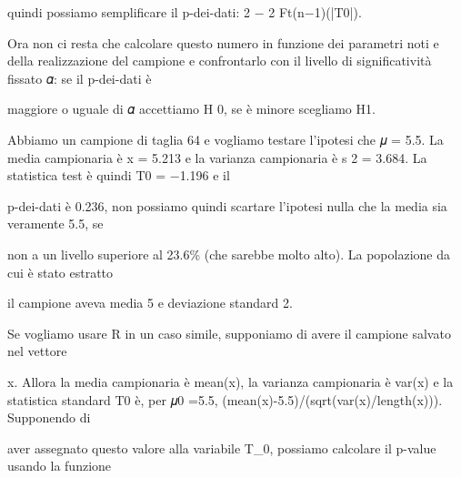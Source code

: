 \documentclass[a4paper,portrait,12pt]{article}
\begin{document}
\begin{flushleft}
quindi possiamo semplificare il p-dei-dati: 2 $-$ 2 Ft(n$-$1)(|T0|).
\end{flushleft}


\begin{flushleft}
Ora non ci resta che calcolare questo numero in funzione dei parametri noti e della realizzazione del campione e confrontarlo con il livello di significativit\`{a} fissato 𝛼: se il p-dei-dati \`{e}
\end{flushleft}


\begin{flushleft}
maggiore o uguale di 𝛼 accettiamo H 0, se \`{e} minore scegliamo H1.
\end{flushleft}


\begin{flushleft}
Abbiamo un campione di taglia 64 e vogliamo testare l'ipotesi che 𝜇 = 5.5. La media campionaria \`{e} x = 5.213 e la varianza campionaria \`{e} s 2 = 3.684. La statistica test \`{e} quindi T0 = $-$1.196 e il
\end{flushleft}


\begin{flushleft}
p-dei-dati \`{e} 0.236, non possiamo quindi scartare l'ipotesi nulla che la media sia veramente 5.5, se
\end{flushleft}


\begin{flushleft}
non a un livello superiore al 23.6\% (che sarebbe molto alto). La popolazione da cui \`{e} stato estratto
\end{flushleft}


\begin{flushleft}
il campione aveva media 5 e deviazione standard 2.
\end{flushleft}


\begin{flushleft}
Se vogliamo usare R in un caso simile, supponiamo di avere il campione salvato nel vettore
\end{flushleft}


\begin{flushleft}
x. Allora la media campionaria \`{e} mean(x), la varianza campionaria \`{e} var(x) e la statistica standard T0 \`{e}, per 𝜇0 =5.5, (mean(x)-5.5)/(sqrt(var(x)/length(x))). Supponendo di
\end{flushleft}


\begin{flushleft}
aver assegnato questo valore alla variabile T\_0, possiamo calcolare il p-value usando la funzione
\end{flushleft}
\end{document}

